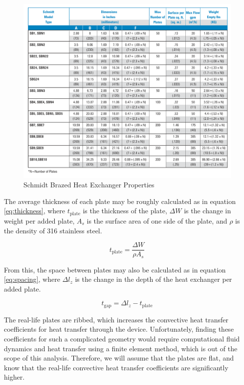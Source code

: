 \documentclass[12pt,letterpaper]{article}
\begin{document}
\begin{figure}
\center
\label{tab:schmidt}
\includegraphics[width=5.0in]{schmidt_props.png}
\caption{Schmidt Brazed Heat Exchanger Properties}
\end{figure}

The average thickness of each plate may be roughly calculated as in equation \ref{eq:thickness}, where \(t_{\textrm{plate}}\) is the thickness of the plate, \(\Delta W\) is the change in weight per added plate, \(A_s\) is the surface area of one side of the plate, and \(\rho\) is the density of 316 stainless steel.

\begin{equation}
\label{eq:thickness}
t_{\textrm{plate}} = \frac{\Delta W}{\rho A_s}
\end{equation}

From this, the space between plates may also be calculated as in equation \ref{eq:spacing}, where \(\Delta l_z\) is the change in the depth of the heat exchanger per added plate.

\begin{equation}
\label{eq:spacing}
t_{\textrm{gap}} = \Delta l_z - t_{\textrm{plate}}
\end{equation}

The real-life plates are ribbed, which increases the convective heat transfer coefficients for heat transfer through the device. Unfortunately, finding these coefficients for such a complicated geometry would require computational fluid dynamics and heat transfer using a finite element method, which is out of the scope of this analysis.  Therefore, we will assume that the plates are flat, and know that the real-life convective heat transfer coefficients are significantly higher.
\end{document}
